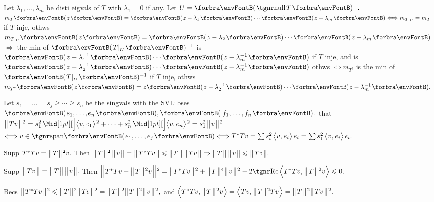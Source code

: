 Let $\lambda_1,\dots,\lambda_m$ be disti eigvals of $T$ with $\lambda_1=0$ if any. Let $U=\Par{\null T}{^\perp}.$\parSol{}
$m_T\Par{z}=\Par{z-\lambda_1}\cdots\Par{z-\lambda_m}\Longleftrightarrow m_{T|_U}=m_T$ if $T$ inje, othws $m_{T|_U}\Par{z}=\Par{z-\lambda_2}\cdots\Par{z-\lambda_m}$\parSol{}
$\Longleftrightarrow$ the min of $\Par{T\mmid_U}{^{-1}}$ is $\Par{z-\lambda_1^{-1}}\cdots\Par{z-\lambda_m^{-1}}$ if $T$ inje, and is $\Par{z-\lambda_2^{-1}}\cdots\Par{z-\lambda_m^{-1}}$ othws\parSol{}
$\Longleftrightarrow m_{T^\dagger}$ is the min of $\Par{T\mmid_U}{^{-1}}$ if $T$ inje, othws $m_{T^\dagger}\Par{z}=z\Par{z-\lambda_2^{-1}}\cdots\Par{z-\lambda_m^{-1}}.$\PfEnd
\SepLine



Let $s_1=\dots=s_j\geqslant\cdots\geqslant s_n$ be the singvals with the SVD bses $\Par{e_1,\dots,e_n},\Par{\,f_1,\dots,f_n}.$\parSol{}
\NOTICE that $\Dvertsq{Tv}=s_1^2\,\innerAsq{v,\:\!e_1}+\dots+s_n^2\,\innerAsq{v,\:\!e_n}=s_1^2\;\!\Dvertsq{v}$\parSol{}
$\Longleftrightarrow v\in\Span{e_1,\dots,e_j}\Longleftrightarrow T^*Tv=\sum s_i^2\,\Ang{v,\:\!e_i}\,e_i=\sum s_1^2\,\Ang{v,\:\!e_i}\,e_i.$\PfEnd\vspace{4pt}\par\quad
\Or Supp $T^*Tv=\Dvertsq{T}v.$ Then $\Dvertsq{T}\,\Dvert{v}=\Dvert{T^*Tv}\leqslant\Dvert{T}\,\Dvert{Tv}\Rightarrow\Dvert{T}\,\Dvert{v}\leqslant\Dvert{Tv}.$\par\quad
Supp $\Dvert{Tv}=\Dvert{T}\,\Dvert{v}.$ Then $\BigDvertsq{T^*Tv-\Dvertsq{T}v}=\Dvertsq{T^*Tv}+\Dvert{T}{^4}\Dvertsq{v}-2\Real\BigAng{T^*Tv,\:\!\Dvertsq{T}v}\leqslant0.$\par\quad
Becs $\Dvertsq{T^*Tv}\leqslant\Dvertsq{T}\Dvertsq{Tv}=\Dvertsq{T}\Dvertsq{T}\Dvertsq{v},$ and $\BigAng{T^*Tv,\:\!\Dvertsq{T}v}=\BigAng{Tv,\:\!\Dvertsq{T}Tv}=\Dvertsq{T}\Dvertsq{Tv}.$\PfEnd
\SepLine

